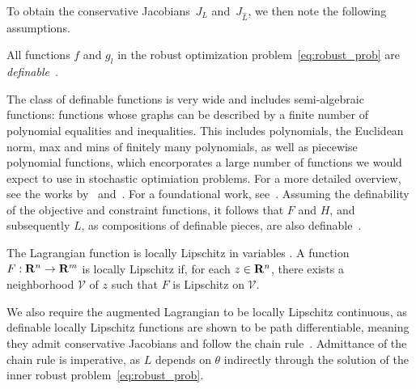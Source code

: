 To obtain the conservative Jacobians~$J_L$ and~$J_{\hat{L}}$, we then note the following assumptions. 
\begin{assumption} [Definability]
    \label{ass:define}
All functions $f$ and $g_l$ in the robust optimization problem~\eqref{eq:robust_prob} are  {\it definable}~\citep{definable,definable2,path-diff}. 
\end{assumption} 
The class of definable functions is very wide and includes semi-algebraic functions: functions whose graphs can be described by a finite number of polynomial equalities and inequalities. This includes polynomials, the Euclidean norm, max and mins of finitely many polynomials, as well as piecewise polynomial functions, which encorporates a large number of functions we would expect to use in stochastic optimiation problems. For a more detailed overview, see the works by~\cite{conservative} and~\cite{path-diff}. For a foundational work, see~\cite{definable}. 
Assuming the definability of the objective and constraint functions, it follows that $F$ and $H$, and subsequently $L$, as compositions of definable pieces, are also definable~\citep{path-diff}. 
\begin{assumption} 
    \label{ass:lip}
    The Lagrangian function  is locally Lipschitz in variables \RC{$\alpha,\theta, \lambda,\mu$}. A function $F:{\mathbf R}^n \rightarrow {\mathbf R}^m$ is locally Lipschitz if, for each $z \in {\mathbf R}^n$, there exists a neighborhood $\mathcal{V}$ of $z$ such that $F$ is Lipschitz on $\mathcal{V}$.
\end{assumption}
We also require the augmented Lagrangian to be locally Lipschitz continuous, as definable locally Lipschitz functions are shown to be path differentiable, meaning they admit conservative Jacobians and follow the chain rule~\citep{path-diff}.
Admittance of the chain rule is imperative, as 
$L$ depends on $\theta$ indirectly through the solution  of the inner robust problem~\eqref{eq:robust_prob}. 
